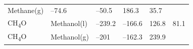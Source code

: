 \documentclass[
]{book}
\theoremstyle{definition}
\theoremstyle{definition}
\theoremstyle{definition}
\theoremstyle{remark}
\begin{document}
\begin{longtable}[]{@{}llllll@{}}
\begin{minipage}[t]{0.17\columnwidth}
Methane(g)\strut
\end{minipage} & \begin{minipage}[t]{0.15\columnwidth}\raggedright
--74.6\strut
\end{minipage} & \begin{minipage}[t]{0.15\columnwidth}\raggedright
--50.5\strut
\end{minipage} & \begin{minipage}[t]{0.14\columnwidth}\raggedright
186.3\strut
\end{minipage} & \begin{minipage}[t]{0.14\columnwidth}\raggedright
35.7\strut
\end{minipage}\tabularnewline
\begin{minipage}[t]{0.07\columnwidth}\raggedright
CH\textsubscript{4}O\strut
\end{minipage} & \begin{minipage}[t]{0.17\columnwidth}\raggedright
Methanol(l)\strut
\end{minipage} & \begin{minipage}[t]{0.15\columnwidth}\raggedright
--239.2\strut
\end{minipage} & \begin{minipage}[t]{0.15\columnwidth}\raggedright
--166.6\strut
\end{minipage} & \begin{minipage}[t]{0.14\columnwidth}\raggedright
126.8\strut
\end{minipage} & \begin{minipage}[t]{0.14\columnwidth}\raggedright
81.1\strut
\end{minipage}\tabularnewline
\begin{minipage}[t]{0.07\columnwidth}\raggedright
CH\textsubscript{4}O\strut
\end{minipage} & \begin{minipage}[t]{0.17\columnwidth}\raggedright
Methanol(g)\strut
\end{minipage} & \begin{minipage}[t]{0.15\columnwidth}\raggedright
--201\strut
\end{minipage} & \begin{minipage}[t]{0.15\columnwidth}\raggedright
--162.3\strut
\end{minipage} & \begin{minipage}[t]{0.14\columnwidth}\raggedright
239.9\strut
\end{minipage} & \begin{minipage}[t]{0.14\columnwidth}\raggedright

\end{minipage}
\end{longtable}
\end{document}
